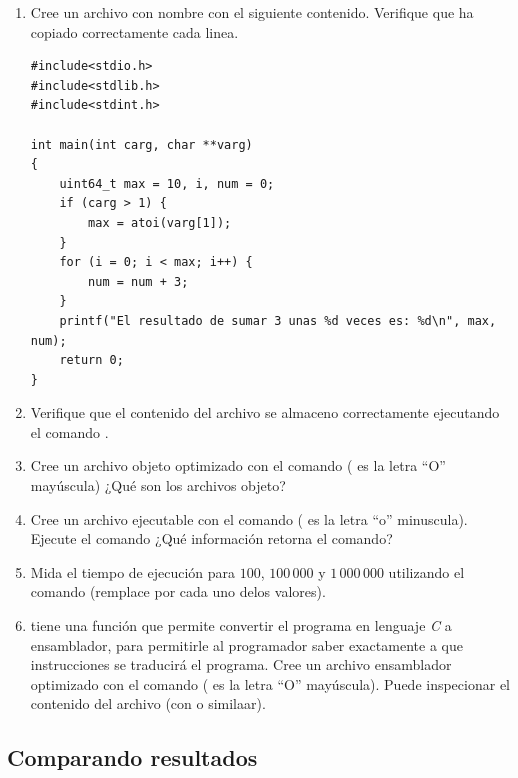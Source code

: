 \documentclass[12pt]{article}
\begin{document}
\begin{enumerate}[resume]

    \item Cree un archivo con nombre  con el siguiente
        contenido. Verifique que ha copiado correctamente cada linea.

        \begin{verbatim}
#include<stdio.h>
#include<stdlib.h>
#include<stdint.h>

int main(int carg, char **varg)
{
    uint64_t max = 10, i, num = 0;
    if (carg > 1) {
        max = atoi(varg[1]);
    }
    for (i = 0; i < max; i++) {
        num = num + 3;
    }
    printf("El resultado de sumar 3 unas %d veces es: %d\n", max, num);
    return 0;
}
        \end{verbatim}

    \item Verifique que el contenido del archivo se almaceno correctamente
        ejecutando el comando .

    \item Cree un archivo objeto optimizado con el comando  ( es la letra ``O'' mayúscula) ¿Qué son los
        archivos objeto?

    \item Cree un archivo ejecutable con el comando  ( es la letra ``o'' minuscula). Ejecute el comando
         ¿Qué información retorna el comando?

    \item Mida el tiempo de ejecución para $100$, $100\,000$ y $1\,000\,000$
        utilizando el comando  (remplace 
        por cada uno delos valores).

    \item {} tiene una función que permite convertir el programa en
        lenguaje \emph{C} a ensamblador, para permitirle al programador saber
        exactamente a que instrucciones se traducirá el programa.  Cree un
        archivo ensamblador optimizado con el comando  ( es la letra ``O'' mayúscula). Puede inspecionar
        el contenido del archivo  (con  o similaar).

\end{enumerate}

\subsection{Comparando resultados}
\end{document}
